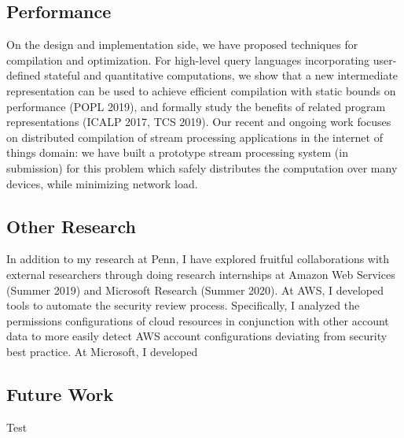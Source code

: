 \documentclass{article}
\begin{document}
\subsection*{Performance}

On the design and implementation side, we have proposed techniques for compilation and optimization. For high-level query languages incorporating user-defined stateful and quantitative computations, we show that a new intermediate representation can be used to achieve efficient compilation with static bounds on performance (POPL 2019), and formally study the benefits of related program representations (ICALP 2017, TCS 2019). Our recent and ongoing work focuses on distributed compilation of stream processing applications in the internet of things domain: we have built a prototype stream processing system (in submission) for this problem which safely distributes the computation over many devices, while minimizing network load.

\subsection*{Other Research}

In addition to my research at Penn, I have explored fruitful collaborations
with external researchers through doing research internships at Amazon Web Services (Summer 2019) and Microsoft Research (Summer 2020).
At AWS, I developed tools to automate the security review process. Specifically, I analyzed the permissions configurations of cloud resources in conjunction with other account data to more easily detect AWS account configurations deviating from security best practice.
At Microsoft, I developed


\subsection*{Future Work}

Test~\cite{popl19}



\end{document}
